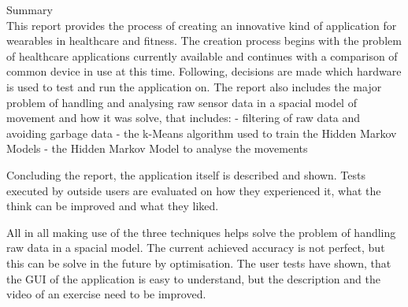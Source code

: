 \hfill{\Huge Summary}\\

This report provides the process of creating an innovative kind of application for wearables in healthcare and fitness.
The creation process begins with the problem of healthcare applications currently available and continues with a comparison of common device in use at this time. Following, decisions are made which hardware is used to test and run the application on. \newline
The report also includes the major problem of handling and analysing raw sensor data in a spacial model of movement and how it was solve, that includes: \newline
- filtering of raw data and avoiding garbage data \newline
- the k-Means algorithm used to train the Hidden Markov Models \newline
- the Hidden Markov Model to analyse the movements
\newline

Concluding the report, the application itself is described and shown. Tests executed by outside users are evaluated on how they experienced it, what the think can be improved and what they liked.
\newline

All in all making use of the three techniques helps solve the problem of handling raw data in a spacial model. The current achieved accuracy is not perfect, but this can be solve in the future by optimisation.
The user tests have shown, that the GUI of the application is easy to understand, but the description and the video of an exercise need to be improved.
